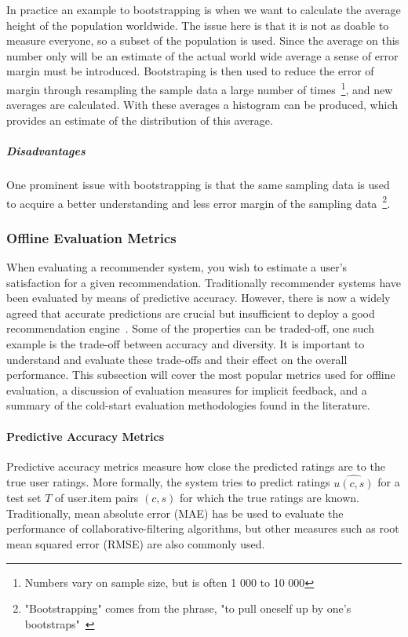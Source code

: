In practice an example to bootstrapping is when we want to calculate the average height of the population worldwide.
The issue here is that it is not as doable to measure everyone, so a subset of the population is used.
Since the average on this number only will be an estimate of the actual world wide average a sense of error margin must be introduced.
Bootstraping is then used to reduce the error of margin through resampling the sample data a large number of times~\footnote{Numbers vary on sample size, but is often 1 000 to 10 000}, and new averages are calculated.
With these averages a histogram can be produced, which provides an estimate of the distribution of this average.

\subparagraph{Disadvantages}
One prominent issue with bootstrapping is that the same sampling data is used to acquire a better understanding and less error margin of the sampling data~\footnote{"Bootstrapping" comes from the phrase, "to pull oneself up by one's bootstraps"~\cite{bootstrapSaying1843}}.


\subsubsection{Offline Evaluation Metrics}
When evaluating a recommender system, you wish to estimate a user's
satisfaction for a given recommendation. Traditionally recommender systems have
been evaluated by means of predictive accuracy. However, there is now a widely
agreed that accurate predictions are crucial but insufficient to deploy a good
recommendation engine~\cite{Shani2011, McNee2006}. Some of the properties can
be traded-off, one such example is the trade-off between accuracy and
diversity. It is important to understand and evaluate these trade-offs and
their effect on the overall performance. This subsection will cover the most
popular metrics used for offline evaluation, a discussion of evaluation
measures for implicit feedback, and a summary of the cold-start evaluation
methodologies found in the literature.

\paragraph{Predictive Accuracy Metrics}
Predictive accuracy metrics measure how close the predicted ratings are to the
true user ratings. More formally, the system tries to predict ratings
$\hat{u(c,s)}$ for a test set $T$ of user.item pairs $(c, s)$ for which the
true ratings are known. Traditionally, mean absolute error (MAE) has be used to
evaluate the performance of collaborative-filtering algorithms, but other
measures such as root mean squared error (RMSE) are also commonly used.

